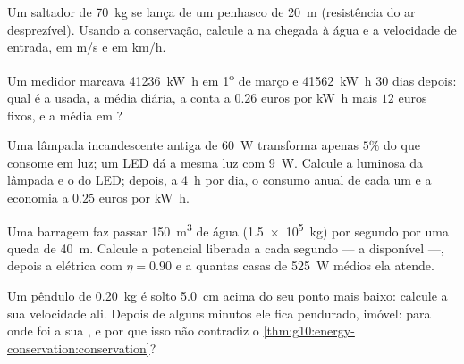 \begin{exercise}[$\star\star$]\label{exo:g10:energy-conservation:7}
Um saltador de \qty{70}{kg} se lança de um penhasco de \qty{20}{m}
(resistência do ar desprezível). Usando a conservação, calcule a  na chegada à água e a velocidade de entrada, em \unit{m/s} e em
\unit{km/h}.
\end{exercise}

\begin{exercise}[$\star\star$]\label{exo:g10:energy-conservation:8}
Um medidor marcava \qty{41236}{kW.h} em 1\textsuperscript{o} de março e
\qty{41562}{kW.h} 30 dias depois: qual é a  usada, a média diária,
a conta a $0.26$ euros por \unit{kW.h} mais $12$ euros fixos, e a
 média em ?
\end{exercise}

\begin{exercise}[$\star\star$]\label{exo:g10:energy-conservation:9}
Uma lâmpada incandescente antiga de \qty{60}{W} transforma apenas $5\%$
do que consome em luz; um LED dá a mesma luz com \qty{9}{W}. Calcule a
 luminosa da lâmpada e o  do LED; depois, a
\qty{4}{h} por dia, o consumo anual de cada um e a economia a $0.25$
euros por \unit{kW.h}.
\end{exercise}

\begin{exercise}[$\star\star$]\label{exo:g10:energy-conservation:10}
Uma barragem faz passar \qty{150}{m^3} de água (\qty{1.5e5}{kg}) por
segundo por uma queda de \qty{40}{m}. Calcule a  potencial
liberada a cada segundo --- a  disponível ---, depois a 
elétrica com $\eta = 0.90$ e a quantas casas de \qty{525}{W} médios ela
atende.
\end{exercise}

\begin{exercise}[$\star\star$]\label{exo:g10:energy-conservation:11}
Um pêndulo de \qty{0.20}{kg} é solto \qty{5.0}{cm} acima do seu ponto
mais baixo: calcule a sua velocidade ali. Depois de alguns minutos ele
fica pendurado, imóvel: para onde foi a sua , e por que isso não
contradiz o \cref{thm:g10:energy-conservation:conservation}?
\end{exercise}

